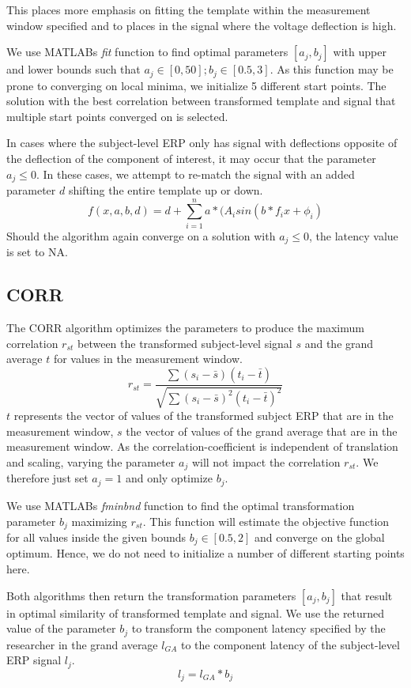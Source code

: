 \documentclass[
  man]{apa7}
\begin{document}
This places more emphasis on fitting the template within the measurement window specified and to places in the signal where the voltage deflection is high.

We use MATLABs \emph{fit} function to find optimal parameters \([a_j, b_j]\) with upper and lower bounds such that \(a_j \in [0, 50]; b_j \in [0.5, 3]\). As this function may be prone to converging on local minima, we initialize 5 different start points. The solution with the best correlation between transformed template and signal that multiple start points converged on is selected.

In cases where the subject-level ERP only has signal with deflections opposite of the deflection of the component of interest, it may occur that the parameter \(a_j \le 0\). In these cases, we attempt to re-match the signal with an added parameter \(d\) shifting the entire template up or down.
\[f(x, a,b, d) = d +\sum_{i = 1}^{n} a*(A_isin(b*f_ix + \phi_i)\]
Should the algorithm again converge on a solution with \(a_j \le 0\), the latency value is set to NA.

\hypertarget{corr}{%
\subsection{CORR}\label{corr}}

The CORR algorithm optimizes the parameters to produce the maximum correlation \(r_{st}\) between the transformed subject-level signal \(s\) and the grand average \(t\) for values in the measurement window.
\[r_{st} = \frac{\sum(s_i - \bar{s})(t_{i} - \bar{t})}{\sqrt{\sum(s_i - \bar{s})^2(t_{i} - \bar{t})^2}}\]
\(t\) represents the vector of values of the transformed subject ERP that are in the measurement window, \(s\) the vector of values of the grand average that are in the measurement window. As the correlation-coefficient is independent of translation and scaling, varying the parameter \(a_j\) will not impact the correlation \(r_{st}\). We therefore just set \(a_j = 1\) and only optimize \(b_j\).

We use MATLABs \emph{fminbnd} function to find the optimal transformation parameter \(b_j\) maximizing \(r_{st}\). This function will estimate the objective function for all values inside the given bounds \(b_j \in [0.5, 2]\) and converge on the global optimum. Hence, we do not need to initialize a number of different starting points here.

Both algorithms then return the transformation parameters \([a_j, b_j]\) that result in optimal similarity of transformed template and signal. We use the returned value of the parameter \(b_j\) to transform the component latency specified by the researcher in the grand average \(l_{GA}\) to the component latency of the subject-level ERP signal \(l_j\).
\[ l_j = l_{GA} * b_j \]
\end{document}
